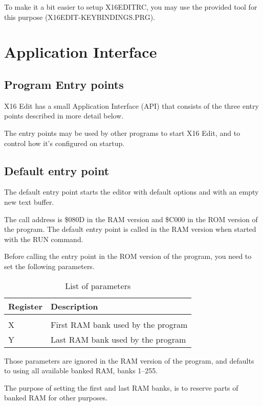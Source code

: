 \documentclass{article}
\begin{document}
To make it a bit easier to setup X16EDITRC, you may use the provided tool for
this purpose (X16EDIT-KEYBINDINGS.PRG).

\section{Application Interface}

    \subsection{Program Entry points}

        X16 Edit has a small Application Interface (API) that consists of the three
        entry points described in more detail below.

        The entry points may be used by other programs to start X16 Edit, and to
        control how it's configured on startup.

    \subsection{Default entry point}

        The default entry point starts the editor with default options and with an
        empty new text buffer.

        The call address is \$080D in the RAM version and \$C000
        in the ROM version of the program. The default entry point is called in
        the RAM version when started with the RUN command.

        Before calling the entry point in the ROM version of the program, you need to set the following
        parameters.

        \begin{longtable}{l l}
            \caption{List of parameters} \\
	        \textbf{Register} & \textbf{Description} \\
	        \hline \\
            X  & First RAM bank used by the program \\
            Y  & Last RAM bank used by the program \\
        \end{longtable}

        \noindent Those parameters are ignored in the RAM version of the program, and
        defaults to using all available banked RAM, banks 1--255.

        The purpose of setting the first and last RAM banks, is to reserve parts of banked RAM
        for other purposes.
\end{document}
